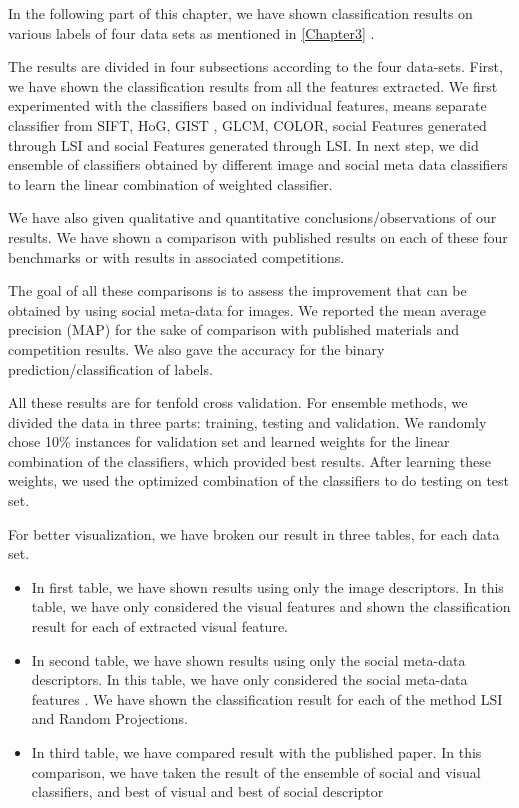 In the following part of this chapter, we have shown classification results on various labels of four data sets as mentioned in \ref{Chapter3} .

The results are divided in four subsections according to the four data-sets. First, we have shown  the classification results from all the features  extracted. We first experimented with the classifiers based on individual features, means separate classifier from SIFT, HoG, 
GIST , GLCM, COLOR, social Features generated through LSI and social Features generated through LSI. In next step, we did ensemble of classifiers obtained by different image and social meta data classifiers to learn the linear combination of weighted classifier.

We have also given qualitative and quantitative conclusions/observations  of our results. We have shown a comparison with published results  on each of these four benchmarks or with results in associated competitions. 

The goal of all these comparisons is to assess the improvement that can be obtained by using social meta-data for images. We reported the mean average precision (MAP) for the sake of comparison with published materials and competition results. We also gave the accuracy for the binary prediction/classification of labels.

All these results are for tenfold cross validation. For ensemble methods, we divided the data in three parts: training, testing and validation. We randomly chose 10\% instances for validation set and learned weights for the linear combination of the classifiers, which provided best results. After learning these weights, we used the optimized combination of the classifiers to do testing on test set.

For better visualization, we have broken our result in three tables, for each data set.
\begin{itemize}
\item In first table, we have shown results using only the image descriptors. In this table, we have only considered the visual features and shown the classification result for each of extracted visual feature.
\item In second table, we have shown results using only the social meta-data descriptors. In this table, we have only considered the social meta-data features . We have shown the classification result for each of the method LSI and Random Projections.
\item In third table, we have compared result with the published paper. In this comparison, we have taken the result of the ensemble of social and visual classifiers, and best of visual and best of social descriptor 
\end{itemize}


